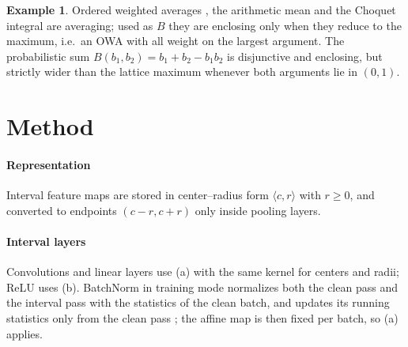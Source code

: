 \documentclass[preprint,12pt]{elsarticle}
\theoremstyle{definition}
\newtheorem{example}[theorem]{Example}
\begin{document}
\begin{example}
Ordered weighted averages \cite{forcen2020}, the arithmetic mean and the Choquet integral \cite{bustince2013choquet} are averaging; used as $B$ they are enclosing only when they reduce to the maximum, i.e.\ an OWA with all weight on the largest argument. The probabilistic sum $B(b_1,b_2)=b_1+b_2-b_1b_2$ is disjunctive and enclosing, but strictly wider than the lattice maximum whenever both arguments lie in $(0,1)$.
\end{example}


\section{Method}
\label{sec:method}

\paragraph{Representation} Interval feature maps are stored in center--radius form $\langle c,r\rangle$ with $r\ge0$, and converted to endpoints $(c-r,c+r)$ only inside pooling layers.

\paragraph{Interval layers} Convolutions and linear layers use (a) with the same kernel for centers and radii; ReLU uses (b). BatchNorm in training mode normalizes both the clean pass and the interval pass with the statistics of the clean batch, and updates its running statistics only from the clean pass \cite{shi2021,ioffe2015}; the affine map is then fixed per batch, so (a) applies.
\end{document}
